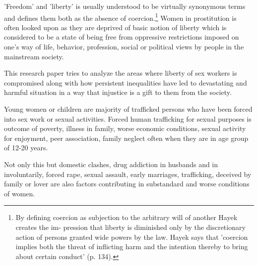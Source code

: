 \begin{multicols}{2}
\noi
'Freedom' and 'liberty' is usually understood to be virtually synonymous terms and defines them
both as the absence of coercion.\footnote{By defining coercion as subjection to the arbitrary will of another Hayek creates the im- pression that liberty is diminished only by the discretionary action of persons granted wide powers by the law. Hayek says that 'coercion
implies both the threat of inflicting harm and the intention thereby to bring about certain conduct' (p. 134).} Women in prostitution is often looked upon as they are
deprived of basic notion of liberty which is considered to be a state of being free from
oppressive restrictions imposed on one's way of life, behavior, profession, social or political
views by people in the mainstream society.

\noi
This research paper tries to analyze the areas where liberty of sex workers is compromised
along with how persistent inequalities have led to devastating and harmful situation in a way
that injustice is a gift to them from the society.


\noi
Young women or children are majority of trafficked persons who have been forced into sex
work or sexual activities. Forced human trafficking for sexual purposes is outcome of poverty,
illness in family, worse economic conditions, sexual activity for enjoyment, peer association,
family neglect often when they are in age group of 12-20 years.

\noi
Not only this but domestic clashes, drug addiction in husbands and in involuntarily, forced
rape, sexual assault, early marriages, trafficking, deceived by family or lover are also factors
contributing in substandard and worse conditions of women.

\vspace{-.15cm}


\end{multicols}
